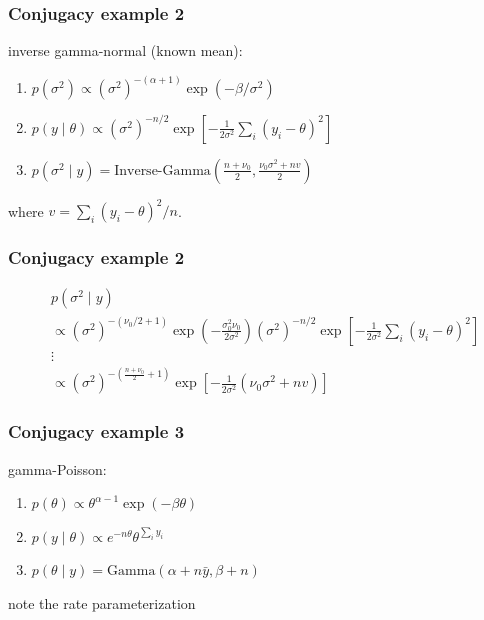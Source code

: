 \documentclass{beamer}
\begin{document}

\begin{frame}[fragile]
\frametitle{Conjugacy example 2}


inverse gamma-normal (known mean):
\begin{enumerate}
\item $p(\sigma^2 ) \propto (\sigma^2)^{-(\alpha+1)} \exp\left( -\beta / \sigma^2 \right)$
\item $p(y \mid \theta) \propto (\sigma^2)^{-n/2} \exp\left[-\frac{1}{2 \sigma^2} \sum_i \left(y_i - \theta \right)^2 \right] $
\item $p(\sigma^2 \mid y) = \text{Inverse-Gamma}\left(\frac{n + \nu_0}{2}, \frac{ \nu_0 \sigma^2 + n v }{2} \right)$
\end{enumerate}
where $v = \sum_i(y_i - \theta)^2 / n$.

\end{frame}



\begin{frame}[fragile]
\frametitle{Conjugacy example 2}

\begin{align*}
&p(\sigma^2 \mid y)\\
&\propto (\sigma^2)^{-(\nu_0/2+1)} \exp\left( - \frac{\sigma_0^2 \nu_0}{ 2\sigma^2} \right)(\sigma^2)^{-n/2} \exp\left[-\frac{1}{2 \sigma^2} \sum_i \left(y_i - \theta \right)^2 \right] \\
& \vdots \tag{homework} \\
&\propto (\sigma^2)^{-(\frac{n + \nu_0}{2}  +1)} \exp\left[-\frac{1}{2 \sigma^2}\left(\nu_0 \sigma^2 + n v  \right)  \right]
\end{align*}

\end{frame}


\begin{frame}[fragile]
\frametitle{Conjugacy example 3}


gamma-Poisson:
\begin{enumerate}
\item $p(\theta) \propto \theta^{\alpha - 1}\exp\left( - \beta \theta \right)$
\item $p(y \mid \theta) \propto e^{-n\theta} \theta^{\sum_i y_i}$
\item $p(\theta \mid y)  = \text{Gamma}(\alpha + n\bar{y}, \beta + n)$
\end{enumerate}

note the rate parameterization
\end{frame}
\end{document}
